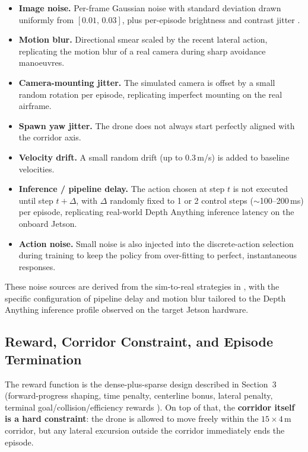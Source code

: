\documentclass[../main.tex]{subfiles}
\begin{document}
\begin{itemize}
  \item \textbf{Image noise.} Per-frame Gaussian noise with standard deviation drawn uniformly from $[0.01,\,0.03]$, plus per-episode brightness and contrast jitter \cite{Loquercio2019,Zhao2020}.
  \item \textbf{Motion blur.} Directional smear scaled by the recent lateral action, replicating the motion blur of a real camera during sharp avoidance manoeuvres.
  \item \textbf{Camera-mounting jitter.} The simulated camera is offset by a small random rotation per episode, replicating imperfect mounting on the real airframe.
  \item \textbf{Spawn yaw jitter.} The drone does not always start perfectly aligned with the corridor axis.
  \item \textbf{Velocity drift.} A small random drift (up to $0.3$\,m/s) is added to baseline velocities.
  \item \textbf{Inference / pipeline delay.} The action chosen at step $t$ is not executed until step $t+\Delta$, with $\Delta$ randomly fixed to 1 or 2 control steps ($\sim$100--200\,ms) per episode, replicating real-world Depth Anything inference latency on the onboard Jetson.
  \item \textbf{Action noise.} Small noise is also injected into the discrete-action selection during training to keep the policy from over-fitting to perfect, instantaneous responses.
\end{itemize}

These noise sources are derived from the sim-to-real strategies in \cite{Loquercio2019,Zhao2020,Salvato2021}, with the specific configuration of pipeline delay and motion blur tailored to the Depth Anything inference profile observed on the target Jetson hardware.

\subsection{Reward, Corridor Constraint, and Episode Termination}

The reward function is the dense-plus-sparse design described in Section~3 (forward-progress shaping, time penalty, centerline bonus, lateral penalty, terminal goal/collision/efficiency rewards \cite{Schulman2017,Kabas2022,Loquercio2019,DelCol2025}). On top of that, the \textbf{corridor itself is a hard constraint}: the drone is allowed to move freely within the $15\times4$\,m corridor, but any lateral excursion outside the corridor immediately ends the episode.
\end{document}
